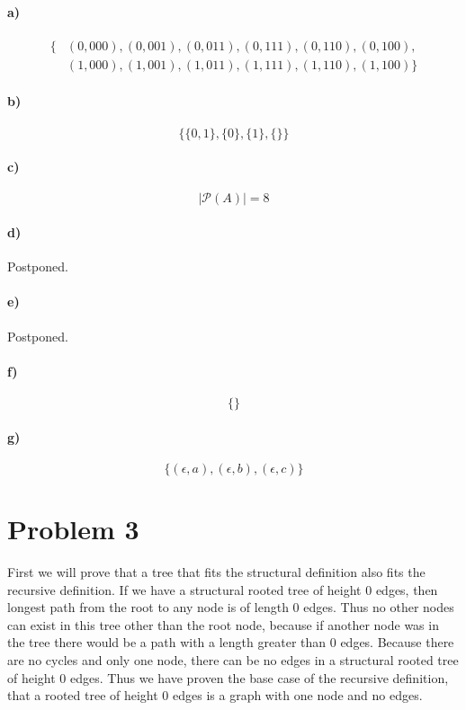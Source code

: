 \documentclass[12pt]{article}
\begin{document}
\paragraph{a)}

\begin{align*}
\{&(0,000),(0,001),(0,011),(0,111),(0,110),(0,100),\\
&(1,000),(1,001),(1,011),(1,111),(1,110),(1,100)\}
\end{align*}

\paragraph{b)}

\[\{\{0,1\},\{0\},\{1\},\{\}\}\]

\paragraph{c)}

\[|\mathcal{P}(A)|=8\]

\paragraph{d)}

Postponed.

\paragraph{e)}

Postponed.

\paragraph{f)}

\[\{\}\]

\paragraph{g)}

\[\{(\epsilon,a),(\epsilon,b),(\epsilon,c)\}\]

\section*{Problem 3}

First we will prove that a tree that fits the structural definition also fits the recursive definition. If we have a structural rooted tree of height
\(0\) edges, then longest path from the root to any node is of length \(0\) edges. Thus no other nodes can exist in this tree other than the root node, because
if another node was in the tree there would be a path with a length greater than \(0\) edges. Because there are no cycles and only one node, there can be no edges
in a structural rooted tree of height \(0\) edges. Thus we have proven the base case of the recursive definition, that a rooted tree of height \(0\) edges
is a graph with one node and no edges.
\end{document}

